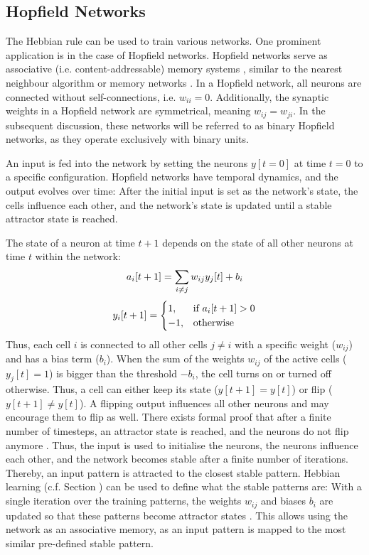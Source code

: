 \subsection{Hopfield Networks}
The Hebbian rule can be used to train various networks.
One prominent application is in the case of Hopfield networks.
Hopfield networks serve as associative (i.e. content-addressable) memory systems , similar to the nearest neighbour algorithm  or memory networks .
In a Hopfield network, all neurons are connected without self-connections, i.e. $w_{ii}=0$.
Additionally, the synaptic weights in a Hopfield network are symmetrical, meaning \(w_{ij} = w_{ji}\).
In the subsequent discussion, these networks will be referred to as binary Hopfield networks, as they operate exclusively with binary units.

An input is fed into the network by setting the neurons $y[t=0]$ at time $t=0$ to a specific configuration.
Hopfield networks have temporal dynamics, and the output evolves over time: After the initial input is set as the network's state, the cells influence each other, and the network's state is updated until a stable attractor state is reached.

The state of a neuron at time $t+1$ depends on the state of all other neurons at time $t$ within the network:
%
\begin{align}\eqlbl{hf_1}
	a_i[t+1] = \sum_{i \neq j} w_{ij} y_j[t] + b_i
\end{align}
%
\begin{align}\eqlbl{hf_2}
	y_i[t+1] = \begin{cases}
      		1, & \text{if } a_i[t+1] > 0 \\
      		-1, & \text{otherwise}
    	\end{cases}
\end{align}
%
Thus, each cell $i$ is connected to all other cells $j \neq i$ with a specific weight ($w_{ij}$) and has a bias term ($b_i$). 
When the sum of the weights $w_{ij}$ of the active cells ($y_j[t] = 1$) is bigger than the threshold $-b_i$, the cell turns on or turned off otherwise.
Thus, a cell can either keep its state ($y[t+1] = y[t]$) or flip ($y[t+1] \neq y[t]$).
A flipping output influences all other neurons and may encourage them to flip as well.
There exists formal proof that after a finite number of timesteps, an attractor state is reached, and the neurons do not flip anymore .
Thus, the input is used to initialise the neurons, the neurons influence each other, and the network becomes stable after a finite number of iterations. Thereby, an input pattern is attracted to the closest stable pattern.
Hebbian learning (c.f. Section ) can be used to define what the stable patterns are:
With a single iteration over the training patterns, the weights $w_{ij}$ and biases $b_i$ are updated so that these patterns become attractor states .
This allows using the network as an associative memory, as an input pattern is mapped to the most similar pre-defined stable pattern.

